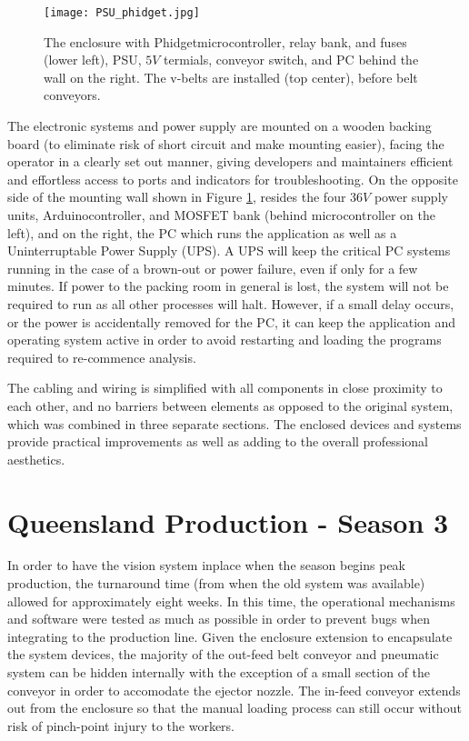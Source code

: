 \documentclass[fleqn,twoside,12pt]{report}
\begin{document}
\begin{figure}[h]
	\centering
	\texttt{[image: PSU\_phidget.jpg]}
	\caption{The enclosure with Phidget\texttrademark microcontroller, relay bank, and fuses (lower left), PSU, $5V$ termials, conveyor switch, and PC behind the wall on the right. The v-belts are installed (top center), before belt conveyors.}
	\label{fig:PSU_phidget}
\end{figure}%


The electronic systems and power supply are mounted on a wooden backing board (to eliminate risk of short circuit and make mounting easier), facing the operator in a clearly set out manner, giving developers and maintainers efficient and effortless access to ports and indicators for troubleshooting. On the opposite side of the mounting wall shown in Figure \ref{fig:PSU_phidget}, resides the four $36V$ power supply units, Arduino\texttrademark controller, and MOSFET bank (behind microcontroller on the left), and on the right, the PC which runs the application as well as a Uninterruptable Power Supply (UPS). A UPS will keep the critical PC systems running in the case of a brown-out or power failure, even if only for a few minutes. If power to the packing room in general is lost, the system will not be required to run as all other processes will halt. However, if a small delay occurs, or the power is accidentally removed for the PC, it can keep the application and operating system active in order to avoid restarting and loading the programs required to re-commence analysis.

The cabling and wiring is simplified with all components in close proximity to each other, and no barriers between elements as opposed to the original system, which was combined in three separate sections. The enclosed devices and systems provide practical improvements as well as adding to the overall professional aesthetics. 



\section{Queensland Production - Season 3}


In order to have the vision system inplace when the season begins peak production, the turnaround time (from when the old system was available) allowed for approximately eight weeks. In this time, the operational mechanisms and software were tested as much as possible in order to prevent bugs when integrating to the production line. Given the enclosure extension to encapsulate the system devices, the majority of the  out-feed belt conveyor and pneumatic system can be hidden internally with the exception of a small section of the conveyor in order to accomodate the ejector nozzle. The in-feed conveyor extends out from the enclosure so that the manual loading process can still occur without risk of pinch-point injury to the workers.
\end{document}
